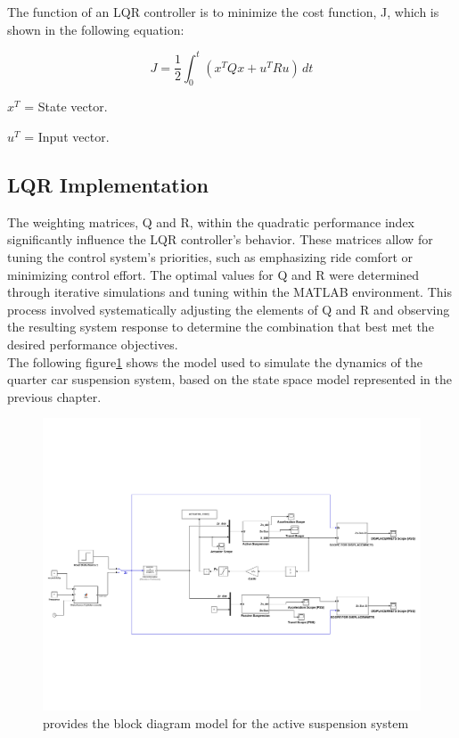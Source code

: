 The function of an LQR controller is to minimize the cost function, J, which is shown in the following equation:

\[
J = \frac{1}{2} \int_{0}^{t} (x^{T}Qx + u^{T}Ru) \, dt 
\]

$x^{T}$ = State vector. 

$u^{T}$ = Input vector.

\subsection{LQR Implementation}
The weighting matrices, Q and R, within the quadratic performance index significantly influence the LQR controller's behavior. These matrices allow for tuning the control system's priorities, such as emphasizing ride comfort or minimizing control effort. The optimal values for Q and R were determined through iterative simulations and tuning within the MATLAB environment. This process involved systematically adjusting the elements of Q and R and observing the resulting system response to determine the combination that best met the desired performance objectives.\\ 

The following figure\ref{fig:lqr-final} shows the model used to simulate the dynamics of the quarter car suspension system, based on the state space model represented in the previous chapter. 

        \begin{figure}[H]
	\centering
	\includegraphics[trim=0cm 5cm 0cm 5cm, clip, width=1\linewidth]{figures/lqr-final.pdf}
	\caption{provides the block diagram model for the active suspension system}
	\label{fig:lqr-final}
\end{figure}


